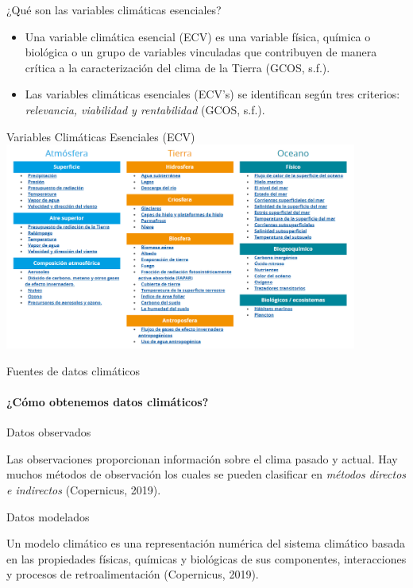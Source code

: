 \documentclass{beamer}
\begin{document}
\begin{frame}{¿Qué son las variables climáticas esenciales?}
	\begin{itemize}
	\setlength\itemsep{1em}  
	\item Una variable climática esencial (ECV) es una variable física, química 	o biológica o un grupo de variables vinculadas que contribuyen de manera crítica a la caracterización del clima de la Tierra (GCOS, s.f.).   
	\item Las variables climáticas esenciales (ECV's) se identifican según tres criterios: \emph{relevancia, viabilidad y rentabilidad} (GCOS, s.f.).
\end{itemize}
\end{frame}

\begin{frame}{Variables Climáticas Esenciales (ECV)}
\includegraphics[height=6.8cm]{img/ecv.png}
\centering
\end{frame}

\begin{frame} {Fuentes de datos climáticos}
\framesubtitle{¿Cómo obtenemos datos climáticos?}
 
\begin{block}{Datos observados}

Las observaciones proporcionan información sobre el clima pasado y actual. Hay muchos métodos de observación los cuales se pueden clasificar en \emph{métodos directos e indirectos} (Copernicus, 2019).

\end{block}
 
\begin{block}{Datos modelados}

Un modelo climático es una representación numérica del sistema climático basada en las propiedades físicas, químicas y biológicas de sus componentes, interacciones y procesos de retroalimentación (Copernicus, 2019).

\end{block}
\end{frame}
\end{document}
